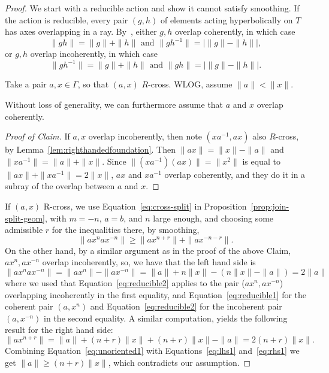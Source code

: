 \begin{proof}
We start with a reducible action and show it cannot satisfy smoothing.
If the action is reducible, every pair $(g,h)$ of elements acting hyperbolically on $T$ has axes overlapping in a ray. By~\cite[Proposition~1.6~(3)]{Pa89:Paulin1989TheGT}, either $g,h$ overlap coherently, in which case
\begin{equation}
\|gh \|=\| g \| + \| h \| \mbox{ and } \|gh^{-1} \| = |\|g \|- \| h \| |,
\label{eq:reducible1}
\end{equation}
or $g,h$ overlap incoherently, in which case
\begin{equation}
\|gh^{-1} \| =\| g\| + \| h \| \mbox{ and } \| gh \| = | \| g \| - \| h \||.
\label{eq:reducible2}
\end{equation}

Take a pair $a,x \in \Gamma$, so that $(a,x)$ $R$-cross.
WLOG, assume $\| a \|<\| x \|$.

\begin{claim}
Without loss of generality, we can furthermore assume that $a$ and $x$ overlap coherently.
\end{claim}
\begin{proof}[Proof of Claim]
If $a,x$ overlap incoherently, then note $(xa^{-1}, ax)$ also $R$-cross, by Lemma~\ref{lem:righthandedfoundation}. 
Then $\| ax \| =\| x\|- \|a \|$ and $\| xa^{-1} \| =\| a \| + \| x \|$. Since $\| (xa^{-1})(ax) \| =\| x^2 \|$ is equal to $\| ax \| + \| xa^{-1} \|= 2\| x \|$, $ax$ and $xa^{-1}$ overlap coherently, and they do it in a subray of the overlap between $a$ and $x$.
\end{proof}
If $(a,x)$ R-cross, we use Equation~\ref{eq:cross-split} in Proposition~\ref{prop:join-split-geom}, with $m=-n$, $a=b$, and $n$ large enough, and choosing some admissible $r$ for the inequalities there, by smoothing,
\begin{equation}
 \| ax^nax^{-n} \| \geq \| ax^{n+r} \| + \| ax^{-n-r} \|.
 \label{eq:unoriented1}
\end{equation}
On the other hand, by a similar argument as in the proof of the above Claim, $ax^n, ax^{-n}$ overlap incoherently, so, we have that the left hand side is
\begin{equation}
\|ax^nax^{-n} \| = \| ax^n \| - \|ax^{-n} \| = \| a \| + n\| x \| - (n\| x \|-\|a\|) = 2\|a\|
\label{eq:lhs1}
\end{equation}
where we used that Equation~\ref{eq:reducible2} applies to the pair ($ax^n,ax^{-n}$) overlapping incoherently in the first equality, and Equation~\ref{eq:reducible1} for the coherent pair $(a,x^n)$ and Equation~\ref{eq:reducible2} for the incoherent pair $(a,x^{-n})$ in the second equality.
A similar computation, yields the following result for the right hand side:
\begin{equation}
\|ax^{n+r}\|=\|a\|+(n+r)\|x\| + (n+r)\|x\|-\|a\| = 2(n+r)\|x\|.
\label{eq:rhs1}
\end{equation}
Combining Equation~\ref{eq:unoriented1} with Equations~\ref{eq:lhs1} and~\ref{eq:rhs1} we get $\|a \| \geq (n+r)\|x\|$, which contradicts our assumption.
\end{proof}

